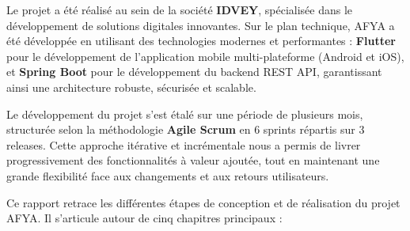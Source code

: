 Le projet a été réalisé au sein de la société \textbf{IDVEY}, spécialisée dans le développement de solutions digitales innovantes. Sur le plan technique, AFYA a été développée en utilisant des technologies modernes et performantes : \textbf{Flutter} pour le développement de l'application mobile multi-plateforme (Android et iOS), et \textbf{Spring Boot} pour le développement du backend REST API, garantissant ainsi une architecture robuste, sécurisée et scalable.

Le développement du projet s'est étalé sur une période de plusieurs mois, structurée selon la méthodologie \textbf{Agile Scrum} en 6 sprints répartis sur 3 releases. Cette approche itérative et incrémentale nous a permis de livrer progressivement des fonctionnalités à valeur ajoutée, tout en maintenant une grande flexibilité face aux changements et aux retours utilisateurs.

Ce rapport retrace les différentes étapes de conception et de réalisation du projet AFYA. Il s'articule autour de cinq chapitres principaux :

